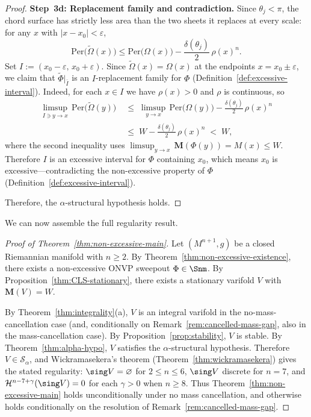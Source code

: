 \begin{proof}
\medskip\noindent\textbf{Step~3d: Replacement family and contradiction.}
Since $\theta_j < \pi$, the chord surface has strictly less area than the two sheets it replaces at every scale: for any $x$ with $|x - x_0| < \varepsilon$,
\[
    \mathrm{Per}\big(\tilde{\Omega}(x)\big) \leq \mathrm{Per}\big(\Omega(x)\big) - \frac{\delta(\theta_j)}{2}\,\rho(x)^n.
\]
Set $I := (x_0 - \varepsilon,\, x_0 + \varepsilon)$. Since $\tilde{\Omega}(x) = \Omega(x)$ at the endpoints $x = x_0 \pm \varepsilon$, we claim that $\tilde{\Phi}|_{\bar{I}}$ is an $I$-replacement family for $\Phi$ (Definition~\ref{def:excessive-interval}). Indeed, for each $x \in I$ we have $\rho(x) > 0$ and $\rho$ is continuous, so
\begin{align*}
    \limsup_{I \ni y \to x}\, \mathrm{Per}\big(\tilde{\Omega}(y)\big)
    &\;\leq\; \limsup_{y \to x}\, \mathrm{Per}\big(\Omega(y)\big)
    - \frac{\delta(\theta_j)}{2}\,\rho(x)^n \\
    &\;\leq\; W - \frac{\delta(\theta_j)}{2}\,\rho(x)^n
    \;<\; W,
\end{align*}
where the second inequality uses $\limsup_{y \to x}\,\mathbf{M}(\Phi(y)) = M(x) \leq W$.
Therefore $I$ is an excessive interval for $\Phi$ containing $x_0$, which means $x_0$ is excessive---contradicting the non-excessive property of $\Phi$ (Definition~\ref{def:excessive-interval}).

\medskip
Therefore, the $\alpha$-structural hypothesis holds.
\end{proof}

We can now assemble the full regularity result.

\begin{proof}[Proof of Theorem~\ref{thm:non-excessive-main}]
Let $(M^{n+1}, g)$ be a closed Riemannian manifold with $n \geq 2$. By Theorem~\ref{thm:non-excessive-existence}, there exists a non-excessive ONVP sweepout $\Phi \in \Snm$. By Proposition~\ref{thm:CLS-stationary}, there exists a stationary varifold $V$ with $\mathbf{M}(V) = W$.

By Theorem~\ref{thm:integrality}(a), $V$ is an integral varifold in the no-mass-cancellation case (and, conditionally on Remark~\ref{rem:cancelled-mass-gap}, also in the mass-cancellation case). By Proposition~\ref{prop:stability}, $V$ is stable. By Theorem~\ref{thm:alpha-hypo}, $V$ satisfies the $\alpha$-structural hypothesis. Therefore $V \in \mathcal{S}_\alpha$, and Wickramasekera's theorem (Theorem~\ref{thm:wickramasekera}) gives the stated regularity: $\sing V = \varnothing$ for $2 \leq n \leq 6$, $\sing V$ discrete for $n = 7$, and $\mathcal{H}^{n-7+\gamma}(\sing V) = 0$ for each $\gamma > 0$ when $n \geq 8$. Thus Theorem~\ref{thm:non-excessive-main} holds unconditionally under no mass cancellation, and otherwise holds conditionally on the resolution of Remark~\ref{rem:cancelled-mass-gap}.
\end{proof}

